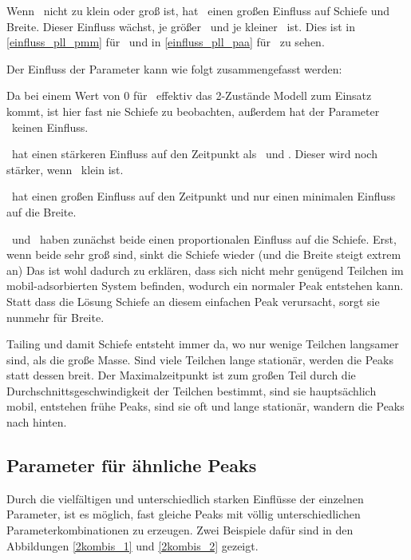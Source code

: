 Wenn \pml\ nicht zu klein oder groß ist, hat \pll\ einen großen Einfluss auf Schiefe und Breite. Dieser Einfluss wächst, je größer \pmm\ und je kleiner \paa\ ist. Dies ist in \ref{einfluss_pll_pmm} für \pmm\ und in \ref{einfluss_pll_paa} für \paa\ zu sehen. 



Der Einfluss der Parameter kann wie folgt zusammengefasst werden:

Da bei einem Wert von $0$ für \pml\ effektiv das 2-Zustände Modell zum Einsatz kommt, ist hier fast nie Schiefe zu beobachten, außerdem hat der Parameter \pll\ keinen Einfluss. 

\paa\ hat einen stärkeren Einfluss auf den Zeitpunkt als \pll\ und \pml. Dieser wird noch stärker, wenn \pmm\ klein ist.

\pmm\ hat einen großen Einfluss auf den Zeitpunkt und nur einen minimalen Einfluss auf die Breite.

\pml\ und \pll\ haben zunächst beide einen proportionalen Einfluss auf die Schiefe. Erst, wenn beide sehr groß sind, sinkt die Schiefe wieder (und die Breite steigt extrem an) Das ist wohl dadurch zu erklären, dass sich nicht mehr genügend Teilchen im mobil-adsorbierten System befinden, wodurch ein normaler Peak entstehen kann. Statt dass die Lösung Schiefe an diesem einfachen Peak verursacht, sorgt sie nunmehr für Breite.

Tailing und damit Schiefe entsteht immer da, wo nur wenige Teilchen langsamer sind, als die große Masse. Sind viele Teilchen lange stationär, werden die Peaks statt dessen breit. Der Maximalzeitpunkt ist zum großen Teil durch die Durchschnittsgeschwindigkeit der Teilchen bestimmt, sind sie hauptsächlich mobil, entstehen frühe Peaks, sind sie oft und lange stationär, wandern die Peaks nach hinten. 


\subsection{Parameter für ähnliche Peaks}
\label{chapter:eva_gleichePeaks}

Durch die vielfältigen und unterschiedlich starken Einflüsse der einzelnen Parameter, ist es möglich, fast gleiche Peaks mit völlig unterschiedlichen Parameterkombinationen zu erzeugen. Zwei Beispiele dafür sind in den Abbildungen \ref{2kombis_1} und \ref{2kombis_2} gezeigt.

